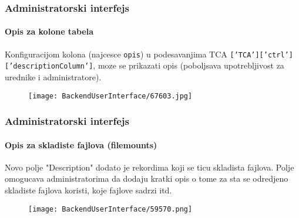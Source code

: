 \begin{frame}[fragile]
	\frametitle{Administratorski interfejs}
	\framesubtitle{Opis za kolone tabela}

	Konfiguracijom kolona (najcesce \texttt{opis}) u podesavanjima TCA \texttt{[’TCA’][’ctrl’][’descriptionColumn’]}, moze se prikazati opis (poboljsava upotrebljivost za urednike i administratore).

	\begin{figure}
		\texttt{[image: BackendUserInterface/67603.jpg]}
	\end{figure}

\end{frame}

\begin{frame}[fragile]
	\frametitle{Administratorski interfejs}
	\framesubtitle{Opis za skladiste fajlova (filemounts)}

	Novo polje "Description" dodato je rekordima koji se ticu skladista fajlova. Polje omogucava administratorima da dodaju kratki opis o tome za sta se odredjeno skladiste fajlova koristi, koje fajlove sadrzi itd.

	\begin{figure}
		\texttt{[image: BackendUserInterface/59570.png]}
	\end{figure}

\end{frame}


